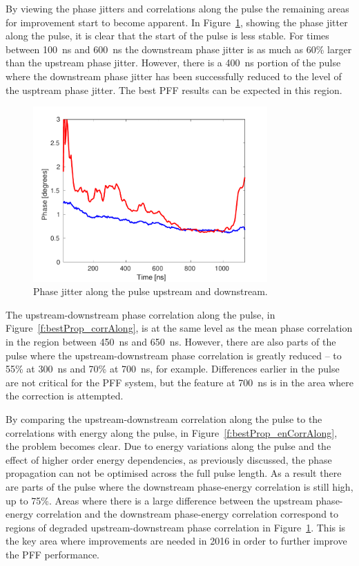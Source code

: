 By viewing the phase jitters and correlations along the pulse the remaining areas for improvement start to become apparent. In Figure~\ref{f:bestProp_jitAlong}, showing the phase jitter along the pulse, it is clear that the start of the pulse is less stable. For times between 100~ns and 600~ns the downstream phase jitter is as much as 60\% larger than the upstream phase jitter.  However, there is a 400~ns portion of the pulse where the downstream phase jitter has been successfully reduced to the level of the usptream phase jitter. The best PFF results can be expected in this region.

\begin{figure}
  \centering
  \includegraphics[width=0.8\textwidth]{Figures/propagation/bestProp_jitAlong}
  \caption{Phase jitter along the pulse upstream and downstream.}
  \label{f:bestProp_jitAlong}
\end{figure}

The upstream-downstream phase correlation along the pulse, in Figure~\ref{f:bestProp_corrAlong}, is at the same level as the mean phase correlation in the region between 450~ns and 650~ns. However, there are also parts of the pulse where the upstream-downstream phase correlation is greatly reduced -- to 55\% at 300~ns and 70\% at 700~ns, for example. Differences earlier in the pulse are not critical for the PFF system, but the feature at 700~ns is in the area where the correction is attempted.

By comparing the upstream-downstream correlation along the pulse to the correlations with energy along the pulse, in Figure~\ref{f:bestProp_enCorrAlong}, the problem becomes clear. Due to energy variations along the pulse and the effect of higher order energy dependencies, as previously discussed, the phase propagation can not be optimised across the full pulse length. As a result there are parts of the pulse where the downstream phase-energy correlation is still high, up to 75\%. Areas where there is a large difference between the upstream phase-energy correlation and the downstream phase-energy correlation correspond to regions of degraded upstream-downstream phase correlation in Figure~\ref{f:bestProp_jitAlong}. This is the key area where improvements are needed in 2016 in order to further improve the PFF performance.

